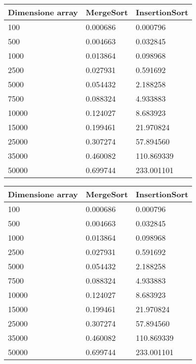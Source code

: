\begin{tabular}{|l|l|l|}
\toprule
 Dimensione array &  MergeSort &  InsertionSort \\
\midrule
              100 &   0.000686 &       0.000796 \\
              500 &   0.004663 &       0.032845 \\
             1000 &   0.013864 &       0.098968 \\
             2500 &   0.027931 &       0.591692 \\
             5000 &   0.054432 &       2.188258 \\
             7500 &   0.088324 &       4.933883 \\
            10000 &   0.124027 &       8.683923 \\
            15000 &   0.199461 &      21.970824 \\
            25000 &   0.307274 &      57.894560 \\
            35000 &   0.460082 &     110.869339 \\
            50000 &   0.699744 &     233.001101 \\
\bottomrule
\end{tabular}
\begin{tabular}{|l|l|l|}
\toprule
\hline
 Dimensione array &  MergeSort &  InsertionSort \\ \hline

\midrule
              100 &   0.000686 &       0.000796 \\ \hline

              500 &   0.004663 &       0.032845 \\ \hline

             1000 &   0.013864 &       0.098968 \\ \hline

             2500 &   0.027931 &       0.591692 \\ \hline

             5000 &   0.054432 &       2.188258 \\ \hline

             7500 &   0.088324 &       4.933883 \\ \hline

            10000 &   0.124027 &       8.683923 \\ \hline

            15000 &   0.199461 &      21.970824 \\ \hline

            25000 &   0.307274 &      57.894560 \\ \hline

            35000 &   0.460082 &     110.869339 \\ \hline

            50000 &   0.699744 &     233.001101 \\ \hline

\bottomrule
\end{tabular}
